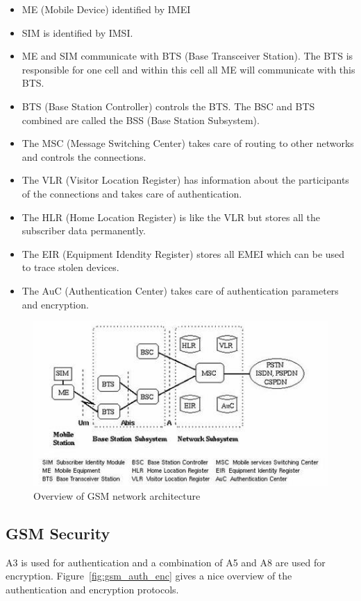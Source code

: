 \documentclass{article}
\begin{document}
\begin{itemize}
\item ME (Mobile Device) identified by IMEI
\item SIM is identified by IMSI.
\item ME and SIM communicate with BTS (Base Transceiver Station). The BTS is responsible for one cell and within this cell all ME will communicate with this BTS.
\item BTS (Base Station Controller) controls the BTS. The BSC and BTS combined are called the BSS (Base Station Subsystem).
\item The MSC (Message Switching Center) takes care of routing to other networks and controls the connections.
\item The VLR (Visitor Location Register) has information about the participants of the connections and takes care of authentication.
\item The HLR (Home Location Register) is like the VLR but stores all the subscriber data permanently.
\item The EIR (Equipment Idendity Register) stores all EMEI which can be used to trace stolen devices.
\item The AuC (Authentication Center) takes care of authentication parameters and encryption.
\end{itemize}


\begin{figure}[!h]
\centering
\includegraphics[width=\textwidth, height=\textheight, keepaspectratio]{images/GSM_Network_Architecture.jpg}
\caption{Overview of GSM network architecture}
\label{fig:gsm_network_architecture}
\end{figure}

\subsection*{GSM Security}
A3 is used for authentication and a combination of A5 and A8 are used for encryption. Figure~\ref{fig:gsm_auth_enc} gives a nice overview of the authentication and encryption protocols. 
\end{document}
